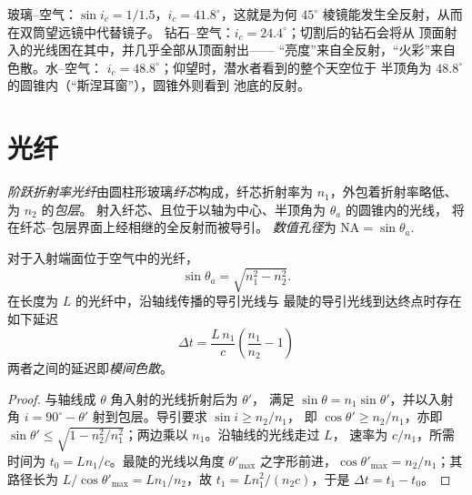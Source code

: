 \begin{example}[钻石与游泳者]\label{ex:b1:rays-reflection-refraction:tir}
玻璃–空气：$\sin i_c = 1/1.5$，$i_c = 41.8^\circ$，这就是为何
$45^\circ$ 棱镜能发生全反射，从而在双筒望远镜中代替镜子。
钻石–空气：$i_c = 24.4^\circ$；切割后的钻石会将从
顶面射入的光线困在其中，并几乎全部从顶面射出——
“亮度”来自全反射，“火彩”来自色散。水–空气：
$i_c = 48.8^\circ$；仰望时，潜水者看到的整个天空位于
半顶角为 $48.8^\circ$ 的圆锥内（“斯涅耳窗”），圆锥外则看到
池底的反射。
\end{example}

\section{光纤}

\begin{definition}[阶跃折射率光纤]\label{def:b1:rays-reflection-refraction:fiber}
\emph{阶跃折射率光纤}由圆柱形玻璃\emph{纤芯}构成，纤芯折射率为
$n_1$，外包着折射率略低、为 $n_2$ 的\emph{包层}。
射入纤芯、且位于以轴为中心、半顶角为 $\theta_a$ 的圆锥内的光线，
将在纤芯–包层界面上经相继的全反射而被导引。
\emph{数值孔径}为
$\mathrm{NA} = \sin\theta_a$.
\end{definition}

\begin{proposition}[接收锥与模间色散]\label{prop:b1:rays-reflection-refraction:fiber}
对于入射端面位于空气中的光纤，
\[
\sin\theta_a = \sqrt{n_1^2 - n_2^2} .
\]
在长度为 $L$ 的光纤中，沿轴线传播的导引光线与
最陡的导引光线到达终点时存在如下延迟
\[
\Delta t = \frac{L\,n_1}{c}\left(\frac{n_1}{n_2} - 1\right)
\]
两者之间的延迟即\emph{模间色散}。
\end{proposition}

\begin{proof}
与轴线成 $\theta$ 角入射的光线折射后为 $\theta'$，
满足 $\sin\theta = n_1\sin\theta'$，并以入射角
$i = 90^\circ - \theta'$ 射到包层。导引要求 $\sin i \geq n_2/n_1$，
即 $\cos\theta' \geq n_2/n_1$，亦即 $\sin\theta' \leq
\sqrt{1 - n_2^2/n_1^2}$；两边乘以 $n_1$。沿轴线的光线走过 $L$，
速率为 $c/n_1$，所需时间为 $t_0 = Ln_1/c$。最陡的光线以角度
$\theta'_{\max}$ 之字形前进，$\cos\theta'_{\max} = n_2/n_1$；其路径长为
$L/\cos\theta'_{\max} = L n_1/n_2$，故 $t_1 = L n_1^2/(n_2 c)$，于是
$\Delta t = t_1 - t_0$。
\end{proof}

